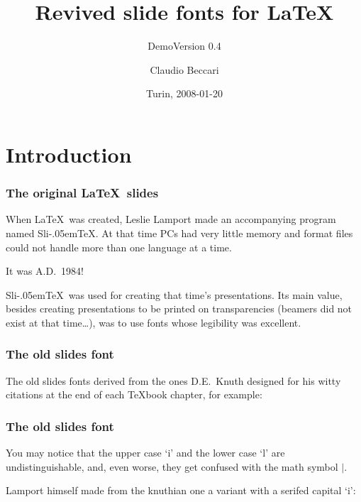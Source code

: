 \documentclass{beamer}
\title{Revived slide fonts for \LaTeX}
\subtitle{Demo\qquad Version 0.4}
\author{Claudio Beccari}
\institute{PdT}
\date{Turin, 2008-01-20}
\newcommand\SliTeX{Sli\kern-.05em\TeX}
\begin{document}
\begin{frame}
\titlepage
\end{frame}


\section{Introduction}

\begin{frame}\frametitle{The original \LaTeX\ slides}
When \LaTeX\ was created, Leslie Lamport made an accompanying program named \SliTeX. At that time PCs had very little memory and format files could not handle more than one language at a time.

\medskip

{\centering\alert{It was A.D.\ 1984!}\par}

\medskip

\SliTeX\ was used for creating that time's presentations. Its main value, besides creating presentations to be printed on transparencies (beamers did not exist at that time\dots), was to use fonts whose legibility was excellent.
\end{frame}

\begin{frame}\frametitle{The old slides font}
The old slides fonts derived from the ones D.E.\ Knuth designed for his witty citations at the end of each \TeX\-book chapter, for example:
\begin{quote}
\end{quote}
\end{frame}

\begin{frame}\frametitle{The old slides font}
You may notice that the upper case `i' and the lower case `l' are undistinguishable, and, even worse, they get confused with the math symbol $|$.

\medskip

Lamport himself made from the knuthian one a variant with a serifed capital `i':
\begin{quote}
\end{quote}
\end{frame}
\end{document}
